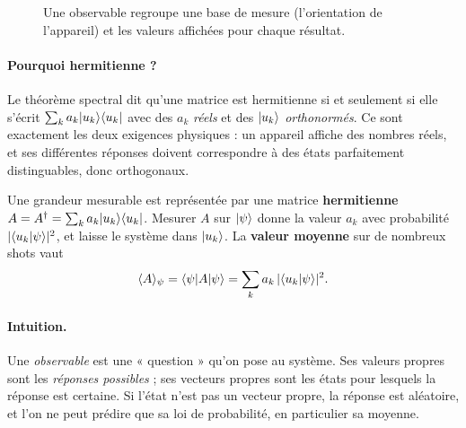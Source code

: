 \begin{figure}[htbp]
\centering
{}
\caption{Une observable regroupe une base de mesure (l'orientation de l'appareil) et les valeurs affichées pour chaque résultat.}\label{fig:observable}
\end{figure}

\paragraph{Pourquoi hermitienne ?} Le théorème spectral dit qu'une matrice est hermitienne si et seulement si elle s'écrit $\sum_ka_k\lvert u_k\rangle\langle u_k\rvert$ avec des $a_k$ \emph{réels} et des $\lvert u_k\rangle$ \emph{orthonormés}. Ce sont exactement les deux exigences physiques : un appareil affiche des nombres réels, et ses différentes réponses doivent correspondre à des états parfaitement distinguables, donc orthogonaux.

\begin{definition}
Une grandeur mesurable est représentée par une matrice \textbf{hermitienne} $A=A^\dagger=\sum_k a_k\lvert u_k\rangle\langle u_k\rvert$. Mesurer $A$ sur $\lvert \psi\rangle$ donne la valeur $a_k$ avec probabilité $|\langle u_k\vert \psi\rangle|^2$, et laisse le système dans $\lvert u_k\rangle$. La \textbf{valeur moyenne} sur de nombreux shots vaut
\[\langle A\rangle_\psi=\langle \psi\rvert A\lvert \psi\rangle=\sum_k a_k\,|\langle u_k\vert \psi\rangle|^2 .\]
\end{definition}
\paragraph{Intuition.} Une \emph{observable} est une « question » qu'on pose au système. Ses valeurs propres sont les \emph{réponses possibles} ; ses vecteurs propres sont les états pour lesquels la réponse est certaine. Si l'état n'est pas un vecteur propre, la réponse est aléatoire, et l'on ne peut prédire que sa loi de probabilité, en particulier sa moyenne.

